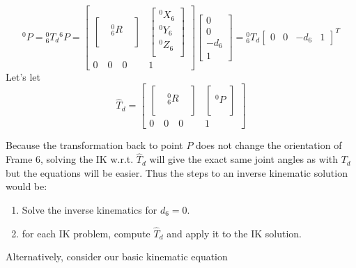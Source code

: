 \[
^0P={^0_6T_d}{^6P} = 
\begin{bmatrix}
\begin{bmatrix}  &  &  \\  & ^0_6R&  \\ & & \\ \end{bmatrix}      &
 \begin{bmatrix} ^0X_6 \\ ^0Y_6  \\ ^0Z_6 \\ \end{bmatrix}            \\
 0 \quad 0 \quad 0      &   1
\end{bmatrix} 
\begin{bmatrix}
    0 \\ 0 \\ -d_6 \\1
\end{bmatrix} =
{^0_6T_d}\begin{bmatrix}
    0 & 0 & -d_6 & 1
\end{bmatrix}^T
\]
Let's let 
\[
\hat{T}_d = \begin{bmatrix}
\begin{bmatrix}  &  &  \\  & ^0_6R&  \\ & & \\ \end{bmatrix}      &
\begin{bmatrix} \\ ^0P \\ \\ \end{bmatrix}            \\
 0 \quad 0 \quad 0      &   1
\end{bmatrix}
\]

Because the transformation back to point $P$ does not change the orientation of Frame 6,
solving the IK w.r.t. $\hat{T}_d$ will give the exact same joint angles as with $T_d$ but the 
equations will be easier.  Thus the steps to an inverse kinematic solution would be:
\begin{enumerate}
    \item Solve the inverse kinematics for $d_6=0$. 
    \item for each IK problem, compute $\hat{T}_d$ and apply it to the IK solution.
\end{enumerate}

Alternatively, 
consider our basic kinematic equation 

